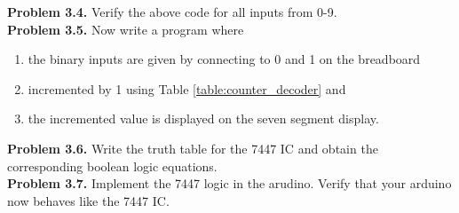 \documentclass[journal,12pt,twocolumn]{IEEEtran}
\begin{document}
\begin{table}[!h]
\begin{center}


\caption{}
\label{table:ip_7447_ard}

\end{center}
\end{table}
\textbf{Problem 3.4.} Verify the above code for all inputs from 0-9.\\
\textbf{Problem 3.5.} Now write a program where 
\begin{enumerate}
	\item the binary inputs are given by
	connecting to 0 and 1 on the breadboard
	\item incremented by 1 using Table \ref{table:counter_decoder} and
	\item the incremented value is displayed on the seven segment display.
\end{enumerate}
\textbf{Problem 3.6.} Write the truth table for the 7447 IC and obtain the corresponding boolean logic equations. \\
\textbf{Problem 3.7.} Implement the 7447 logic in the arudino.  Verify that your arduino now behaves like the 7447 IC.
\end{document}

